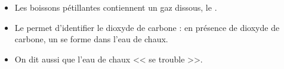 \begin{mybilan}
	\begin{itemize}
		\item Les boissons pétillantes contiennent un gaz dissous, le .
		\item Le  permet d'identifier le dioxyde de carbone : en présence de dioxyde de carbone, un  se forme dans l'eau de chaux.
		\item On dit aussi que l'eau de chaux << se trouble >>.
	\end{itemize}	 
\end{mybilan}